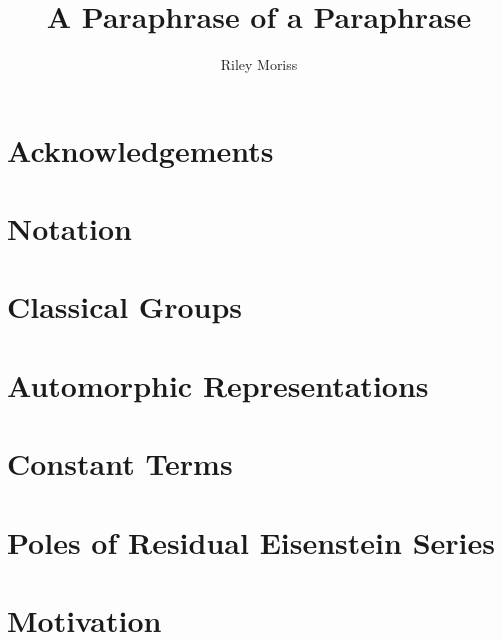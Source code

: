 \documentclass[10pt, openany]{book}
\title{A Paraphrase of a Paraphrase}
\author{Riley Moriss}
\numberwithin{equation}{section}
\theoremstyle{definition}
\theoremstyle{remark}
\numberwithin{equation}{section}
\begin{document}
\begin{comment}%
    \begin{titlepage}
    \begin{center}
    \vspace*{1cm}
    \huge
    \textbf{A Paraphrase of a Paraphrase}\\
    \vspace{2cm}
    \Large
    \text{Riley Moriss}\\
    \vspace{0.5cm}
    \text{Supervisor: Dr. Chenyan Wu }\\    
 
    A thesis submitted in partial fulfillment of the\\
    requirements for the degree of\\
    Master of Science\\
    in the\\
    School of Mathematics and Statistics\\
    at\\
    The University of Melbourne\\
    \vspace{1,5cm}
    October 2024
\end{center}
\end{titlepage}

\pagebreak
\end{comment}

\chapter*{Acknowledgements}


\tableofcontents
{}

\chapter*{Notation}

\chapter{Classical Groups}

\chapter{Automorphic Representations}

\chapter{Constant Terms}

\chapter{Poles of Residual Eisenstein Series}


\appendix
\chapter{Motivation}





\listoftodos
\newpage


\end{document}
